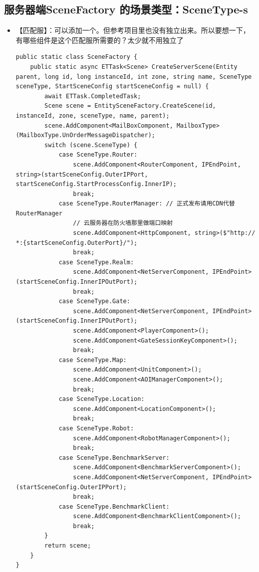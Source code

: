 \documentclass[9pt, b5paper]{article}
\begin{document}
\subsection{服务器端SceneFactory 的场景类型：SceneType-s}
\label{sec-10-1}
\begin{itemize}
\item 【匹配服】：可以添加一个。但参考项目里也没有独立出来。所以要想一下，有哪些组件是这个匹配服所需要的？太少就不用独立了
\begin{verbatim}
public static class SceneFactory {
    public static async ETTask<Scene> CreateServerScene(Entity parent, long id, long instanceId, int zone, string name, SceneType sceneType, StartSceneConfig startSceneConfig = null) {
        await ETTask.CompletedTask;
        Scene scene = EntitySceneFactory.CreateScene(id, instanceId, zone, sceneType, name, parent);
        scene.AddComponent<MailBoxComponent, MailboxType>(MailboxType.UnOrderMessageDispatcher);
        switch (scene.SceneType) {
            case SceneType.Router:
                scene.AddComponent<RouterComponent, IPEndPoint, string>(startSceneConfig.OuterIPPort, startSceneConfig.StartProcessConfig.InnerIP);
                break;
            case SceneType.RouterManager: // 正式发布请用CDN代替RouterManager
                // 云服务器在防火墙那里做端口映射
                scene.AddComponent<HttpComponent, string>($"http:// *:{startSceneConfig.OuterPort}/");
                break;
            case SceneType.Realm:
                scene.AddComponent<NetServerComponent, IPEndPoint>(startSceneConfig.InnerIPOutPort);
                break;
            case SceneType.Gate:
                scene.AddComponent<NetServerComponent, IPEndPoint>(startSceneConfig.InnerIPOutPort);
                scene.AddComponent<PlayerComponent>();
                scene.AddComponent<GateSessionKeyComponent>();
                break;
            case SceneType.Map:
                scene.AddComponent<UnitComponent>();
                scene.AddComponent<AOIManagerComponent>();
                break;
            case SceneType.Location:
                scene.AddComponent<LocationComponent>();
                break;
            case SceneType.Robot:
                scene.AddComponent<RobotManagerComponent>();
                break;
            case SceneType.BenchmarkServer:
                scene.AddComponent<BenchmarkServerComponent>();
                scene.AddComponent<NetServerComponent, IPEndPoint>(startSceneConfig.OuterIPPort);
                break;
            case SceneType.BenchmarkClient:
                scene.AddComponent<BenchmarkClientComponent>();
                break;
        }
        return scene;
    }
}
\end{verbatim}
\end{itemize}
\end{document}
